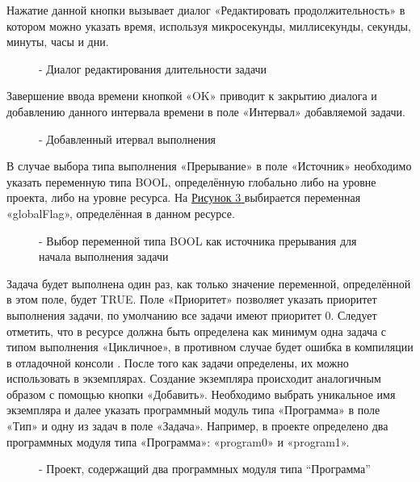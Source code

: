 \documentclass[letterpaper,10pt,russian]{sphinxmanual}
\begin{document}
Нажатие данной кнопки вызывает диалог «Редактировать продолжительность»
в котором можно указать время, используя микросекунды,
миллисекунды, секунды, минуты, часы и дни.
\begin{figure}[htbp]
\centering
\capstart

\noindent{}
\caption{- Диалог редактирования длительности задачи}\label{usage_guide/work_with_project:image198}\end{figure}

Завершение ввода времени кнопкой «OK» приводит к закрытию диалога и
добавлению данного интервала времени в поле «Интервал» добавляемой
задачи.
\begin{figure}[htbp]
\centering
\capstart

\noindent{}
\caption{- Добавленный итервал выполнения}\label{usage_guide/work_with_project:image199}\end{figure}

В случае выбора типа выполнения «Прерывание» в поле «Источник»
необходимо указать переменную типа BOOL, определённую глобально либо на
уровне проекта, либо на уровне ресурса.
На \hyperref[usage_guide/work_with_project:image200]{Рисунок \ref{usage_guide/work_with_project:image200} } выбирается переменная «globalFlag», определённая в данном
ресурсе.
\begin{figure}[htbp]
\centering
\capstart

\noindent{}
\caption{- Выбор переменной типа BOOL как источника прерывания для начала выполнения задачи}\label{usage_guide/work_with_project:image200}\end{figure}

Задача будет выполнена один раз, как только значение переменной,
определённой в этом поле, будет TRUE. Поле «Приоритет» позволяет указать
приоритет выполнения задачи, по умолчанию все задачи имеют приоритет 0.
Следует отметить, что в ресурсе должна быть определена как минимум одна
задача с типом выполнения «Цикличное», в противном случае будет ошибка в
компиляции в отладочной консоли . После того как задачи
определены, их можно использовать в экземплярах. Создание экземпляра
происходит аналогичным образом с помощью кнопки «Добавить». Необходимо
выбрать уникальное имя экземпляра и далее указать программный модуль
типа «Программа» в поле «Тип» и одну из задач в поле «Задача». Например,
в проекте определено два программных модуля типа «Программа»: «program0»
и «program1».
\begin{figure}[htbp]
\centering
\capstart

\noindent{}
\caption{- Проект, содержащий два программных модуля типа ``Программа''}\label{usage_guide/work_with_project:image201}\end{figure}
\end{document}
